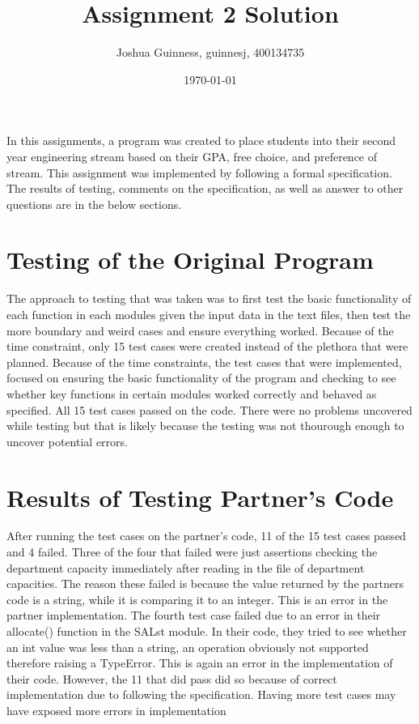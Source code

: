 \documentclass[12pt]{article}
\title{Assignment 2 Solution}
\author{Joshua Guinness, guinnesj, 400134735}
\date{\today}
\begin{document}
\maketitle

In this assignments, a program was created to place students into their second year engineering stream
based on their GPA, free choice, and preference of stream. This assignment was implemented by following a formal
specification. The results of testing, comments on the specification, as well as answer to other questions are in the below sections.

\section{Testing of the Original Program}

The approach to testing that was taken was to first test the basic functionality of each function in each modules
given the input data in the text files, then test the more boundary and weird cases and ensure everything worked.
Because of the time constraint, only 15 test cases were created instead of the plethora that were planned. Because of the time
constraints, the test cases that were implemented, focused on ensuring the basic functionality of the program and checking
to see whether key functions in certain modules worked correctly and behaved as specified. All 15 test cases passed on the code. There
were no problems uncovered while testing but that is likely because the testing was not thourough enough to uncover potential errors.

\section{Results of Testing Partner's Code}

After running the test cases on the partner's code, 11 of the 15 test cases passed and 4 failed. Three of the four that failed
were just assertions checking the department capacity immediately after reading in the file of department capacities. The reason these
failed is because the value returned by the partners code is a string, while it is comparing it to an integer. This is an error
in the partner implementation. The fourth test case failed due to an error in their allocate() function in the SALst module. In their
code, they tried to see whether an int value was less than a string, an operation obviously not supported therefore raising a TypeError.
This is again an error in the implementation of their code. However, the 11 that did pass did so because of correct implementation due
to following the specification. Having more test cases may have exposed more errors in implementation
\end{document}
